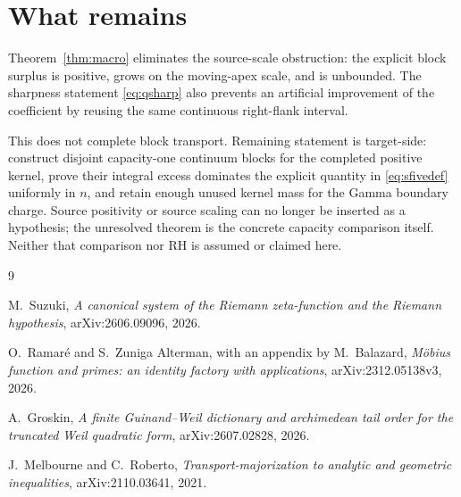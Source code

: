 \documentclass[11pt]{article}
\begin{document}
\section{What remains}\leavevmode\par

Theorem~\ref{thm:macro} eliminates the source-scale obstruction: the explicit block surplus is
positive, grows on the moving-apex scale, and is unbounded.  The sharpness statement
\eqref{eq:qsharp} also prevents an artificial improvement of the coefficient by reusing the same
continuous right-flank interval.

This does not complete block transport.  Remaining statement is target-side: construct disjoint
capacity-one continuum blocks for the completed positive kernel, prove their integral excess
dominates the explicit quantity in \eqref{eq:sfivedef} uniformly in $n$, and retain enough unused
kernel mass for the Gamma boundary charge.  Source positivity or source scaling can no longer be
inserted as a hypothesis; the unresolved theorem is the concrete capacity comparison itself.
Neither that comparison nor RH is assumed or claimed here.

\begin{thebibliography}{9}

M.~Suzuki,
\emph{A canonical system of the Riemann zeta-function and the Riemann hypothesis},
arXiv:2606.09096, 2026.

O.~Ramar\'e and S.~Zuniga Alterman, with an appendix by M.~Balazard,
\emph{M\"obius function and primes: an identity factory with applications},
arXiv:2312.05138v3, 2026.

A.~Groskin,
\emph{A finite Guinand--Weil dictionary and archimedean tail order for the truncated Weil
quadratic form},
arXiv:2607.02828, 2026.

J.~Melbourne and C.~Roberto,
\emph{Transport-majorization to analytic and geometric inequalities},
arXiv:2110.03641, 2021.

\end{thebibliography}
\end{document}
